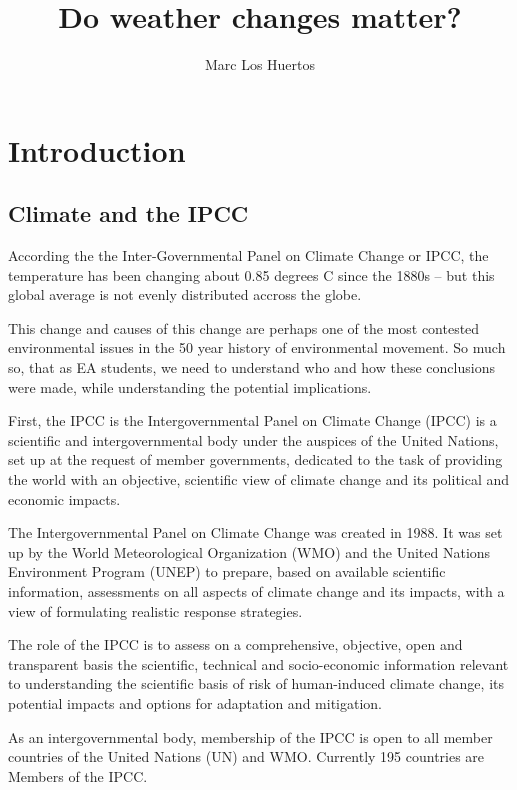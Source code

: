 \documentclass{article}\usepackage[]{graphicx}\usepackage[]{color}
\title{Do weather changes matter?}
\author{Marc Los Huertos}
\begin{document}
\maketitle
\tableofcontents

\section{Introduction}

\subsection{Climate and the IPCC}

According the the Inter-Governmental Panel on Climate Change or IPCC, the temperature has been changing about 0.85 degrees C since the  1880s -- but this global average is not evenly distributed accross the globe. 

This change and causes of this change are perhaps one of the most contested environmental issues in the 50 year history of environmental movement. So much so, that as EA students, we need to understand who and how these conclusions were made, while understanding the potential implications.

First, the IPCC is the Intergovernmental Panel on Climate Change (IPCC) is a scientific and intergovernmental body under the auspices of the United Nations, set up at the request of member governments, dedicated to the task of providing the world with an objective, scientific view of climate change and its political and economic impacts.

The Intergovernmental Panel on Climate Change was created in 1988. It was set up by the World Meteorological Organization (WMO) and the United Nations Environment Program (UNEP) to prepare, based on available scientific information, assessments on all aspects of climate change and its impacts, with a view of formulating realistic response strategies. 

The role of the IPCC is to assess on a comprehensive, objective, open and transparent basis the scientific, technical and socio-economic information relevant to understanding the scientific basis of risk of human-induced climate change, its potential impacts and options for adaptation and mitigation.

As an intergovernmental body, membership of the IPCC is open to all member countries of the United Nations (UN) and WMO. Currently 195 countries are Members of the IPCC.
\end{document}
